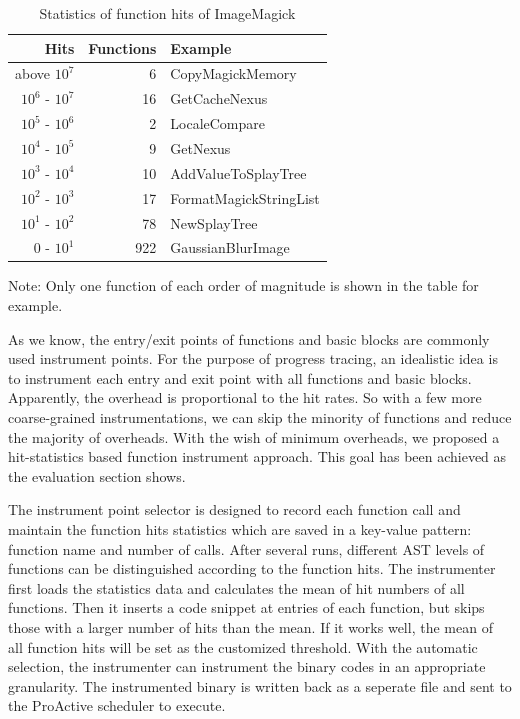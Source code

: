 \begin{table}[h]
\caption{Statistics of function hits of ImageMagick}
\label{table:inst-stats}
\begin{center}
\begin{tabular}{r|r|l}
\hline
Hits & Functions & Example \\
\hline
above $10^7$ & 6 & CopyMagickMemory \\
$10^6$ - $10^7$ & 16 & GetCacheNexus \\
$10^5$ - $10^6$ & 2 & LocaleCompare \\
$10^4$ - $10^5$ & 9 & GetNexus \\
$10^3$ - $10^4$ & 10 & AddValueToSplayTree \\
$10^2$ - $10^3$ & 17 & FormatMagickStringList \\
$10^1$ - $10^2$ & 78 & NewSplayTree \\
$0$    - $10^1$ & 922 & GaussianBlurImage \\
\hline
\end{tabular}
\end{center}
Note: Only one function of each order of magnitude is shown in the table for example.
\end{table}

As we know, the entry/exit points of functions and basic blocks are commonly used
instrument points. For the purpose of progress tracing, an idealistic idea is to instrument 
each entry and exit point with all functions and basic blocks. Apparently, the overhead is
proportional to the hit rates. So with a few more coarse-grained instrumentations, we
can skip the minority of functions and reduce the majority of overheads. With the wish of minimum
overheads, we proposed a hit-statistics based function instrument
approach. This goal has been achieved as the evaluation section shows.

The instrument point selector is designed to record each function call and maintain the
function hits statistics which are saved in a key-value pattern: function name and number of
calls. After several runs, different AST levels of functions can be distinguished
according to the function hits. The instrumenter first loads the statistics data and
calculates the mean of hit numbers of all functions. Then it inserts a code snippet at
entries of each function, but skips those with a larger number of hits than the mean.
If it works well, the mean of all function hits will be set as the customized
threshold. With the automatic selection, the instrumenter can instrument the
binary codes in an appropriate granularity. The instrumented binary is written back as
a seperate file and sent to the ProActive scheduler to execute.


